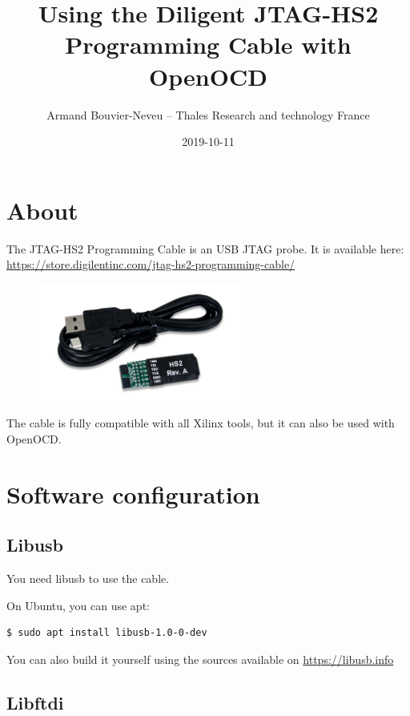\documentclass{article}
\title{Using the Diligent JTAG-HS2 Programming Cable with OpenOCD}
\date{2019-10-11}
\author{Armand Bouvier-Neveu -- Thales Research and technology France}
\begin{document}
	\maketitle
	
	\section{About}
	
	The JTAG-HS2 Programming Cable is an USB JTAG probe. It is available here: \url{https://store.digilentinc.com/jtag-hs2-programming-cable/}
	
	\begin{figure}[H]
   	\centering
   	\includegraphics[width=0.6\textwidth]{hs2.png}
	\end{figure}
	
	The cable is fully compatible with all Xilinx tools, but it can also be used with OpenOCD.
	
	\section{Software configuration}
	
	\subsection{Libusb}
	
	You need libusb to use the cable.
	
	On Ubuntu, you can use apt:
	
	\begin{lstlisting}[language=bash]
    $ sudo apt install libusb-1.0-0-dev
    \end{lstlisting}
    
    You can also build it yourself using the sources available on \url{https://libusb.info}
    
    \subsection{Libftdi}
    
\end{document}
